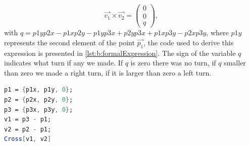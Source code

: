 	\begin{equation}
		\vec{v_1} \times \vec{v_2} = \begin{pmatrix}0\\0\\q\end{pmatrix},
	\end{equation}
with $q = p1y p2x - p1x p2y - p1y p3x + p2y p3x + p1x p3y - p2x p3y$, where $p1y$ represents the second element of the point $\vec{p_1}$, the code used to derive this expression is presented in \autoref{lst:b:formalExpression}. The sign of the variable $q$ indicates what turn if any we made. If $q$ is zero there was no turn, if $q$ smaller than zero we made a right turn, if it is larger than zero a left turn.


\begin{lstlisting}[float, caption={Generation of the formal expression.}, label={lst:b:formalExpression}, language=Mathematica]
p1 = {p1x, p1y, 0};
p2 = {p2x, p2y, 0};
p3 = {p3x, p3y, 0};
v1 = p3 - p1;
v2 = p2 - p1;
Cross[v1, v2]
\end{lstlisting}



